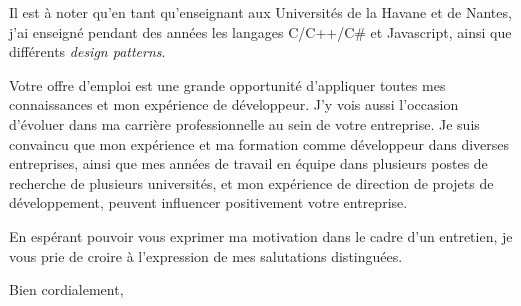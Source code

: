 \documentclass[11pt,a4paper]{letter} %
\newcommand{\resume}{Votre offre d'emploi est une grande opportunité d'appliquer toutes mes connaissances et mon expérience de développeur. J'y vois aussi l'occasion d'évoluer dans ma carrière professionnelle au sein de votre entreprise. Je suis convaincu que mon expérience et ma formation comme développeur dans diverses entreprises, ainsi que mes années de travail en équipe dans plusieurs postes de recherche de plusieurs universités, et mon expérience de direction de projets de développement, peuvent influencer positivement votre entreprise.}
\begin{document}
\begin{letter}
Il est à noter qu'en tant qu'enseignant aux Universités de la Havane et de Nantes, j'ai enseigné pendant des années les langages C/C++/C\# et Javascript, ainsi 
que différents \textit{design patterns}.

\resume{} 


En espérant pouvoir vous exprimer ma motivation dans le cadre d'un entretien, je vous prie de croire %
à l'expression de mes salutations distinguées.

\closing{Bien cordialement,}


\end{letter}
\end{document}
